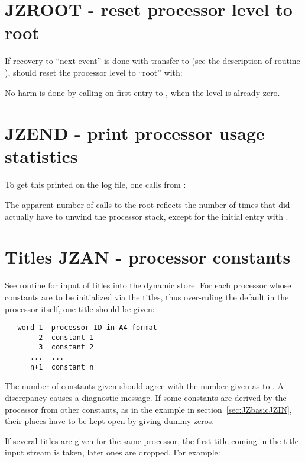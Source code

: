 \section{JZROOT - reset processor level to root}

If recovery to ``next event'' is done with transfer to 
(see the description of routine ),
 should reset the processor level to ``root'' with:


No harm is done by calling  on first entry to ,
when the level is already zero.

\section{JZEND - print processor usage statistics}

To get this printed on the log file, one calls from :


The  apparent number of calls to the root reflects the
number of times that  did actually have to unwind
the processor stack,
except for the initial entry with .

\finalnewpage
{}
\section{Titles JZAN - processor constants}
\enlargethispage{\baselineskip}

See routine  for input of titles into
the dynamic store.
For each processor whose constants are to be initialized
via the titles,
thus over-ruling the default in the processor itself,
one title should be given:

\begin{verbatim}
   word 1  processor ID in A4 format
        2  constant 1
        3  constant 2
      ...  ...
      n+1  constant n
\end{verbatim} 

The number of constants given should agree with
the number given as  to .
A discrepancy causes a diagnostic message.
If some constants are derived by the processor from other
constants,
as in the example in section~\ref{sec:JZbasicJZIN},
their places have to be kept open by giving dummy zeros.

If several titles are given for the same processor,
the first title coming in the title input stream is taken,
later ones are dropped. For example:

